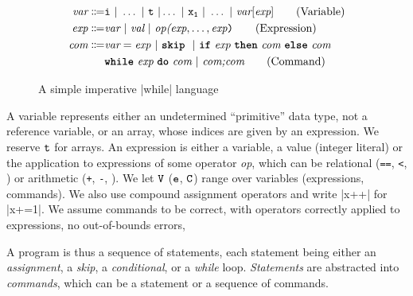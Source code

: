\begin{figure}
    \begin{align*}
        \emph{var} \Coloneqq & \comm{i} \ | \ %
        \hdots \ | \ %
        \comm{t}
        \ | \hdots \ | \ \comm{x_1}%
        \ | \ \hdots %
        \ | \ \emph{var}[\emph{exp}] \tag{Variable} \\
        \emph{exp} \Coloneqq & \emph{var} \ |\ \emph{val} \ |\ \emph{op(}\emph{exp}, \hdots,\emph{exp}\texttt{)} \tag{Expression}                                                                                    \\
        \emph{com} \Coloneqq & \emph{var} \gets \mathit{exp}\ |\  \textnormal{\prc|skip|}\ %
        \ | \
        \textnormal{\prc|if| } \emph{exp} \text{ \prc|then| } \emph{com} \text{ \prc|else| } \emph{com} \\
        & \textnormal{\prc|while| } \emph{exp} \text{ \prc|do| } \emph{com}\ | \ \emph{com;com}
        \tag{Command}
    \end{align*}
    \caption{A simple imperative \prc|while| language}
    \label{fig:grammar}
\end{figure}

A variable represents either an undetermined \enquote{primitive} data type, \eg not a reference variable, or an array, whose indices are given by an expression.
We reserve %
$\mathtt{t}$ for arrays.
An expression is either a variable, a value (\eg integer literal) or the application to expressions of some operator \emph{op}, which can be \eg relational (\texttt{==},  \texttt{<}, \etc) or arithmetic  (\texttt{+}, \texttt{-}, \etc).
We let \(\mathtt{V}\) (\resp \(\mathtt{e}\), \(\mathtt{C}\)) range over variables (\resp expressions, commands).
We also use compound assignment operators and write \eg \prc|x++| for \prc|x+=1|.
We assume commands to be correct, \eg with operators correctly applied to expressions, no out-of-bounds errors, \etc

A program is thus a sequence of statements, each statement being either
an \emph{assignment},
a \emph{skip},
a \emph{conditional},
or a \emph{while} loop.
\emph{Statements} are abstracted into \emph{commands}, which can be a statement or a sequence of commands.

